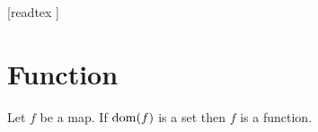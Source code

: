 \documentclass[10pt]{article}
\begin{document}
  \begin{imports}
    \begin{forthel}
      [readtex ]
    \end{forthel}
  \end{imports}


  \section{Function}

  \begin{forthel}
    \begin{axiom}[title=Function Axiom,id=FOUNDATIONS_10_7781693549182976,printid]
      Let $f$ be a map.
      If $\operatorname{dom}(f)$ is a set then $f$ is a function.
    \end{axiom}
  \end{forthel}
\end{document}
